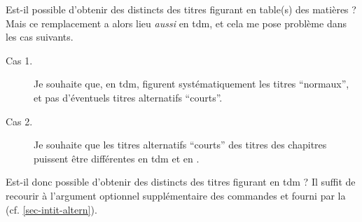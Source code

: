 \begin{dbfaq}{Est-il possible d'obtenir des  distincts
    des titres figurant en table(s) des matières ?}{}
  Mais ce remplacement a alors lieu \emph{aussi} en \gls{tdm}, et cela me pose
  problème dans les cas suivants.
  \begin{description}
  \item[Cas 1.] Je souhaite que, en \gls{tdm}, figurent systématiquement les
    titres \enquote{normaux}, et pas d'éventuels titres alternatifs
    \enquote{courts}.
  \item[Cas 2.] Je souhaite que les titres alternatifs \enquote{courts} des
    titres des chapitres puissent être différentes en \gls{tdm} et en
    .
  \end{description}
  Est-il donc possible d'obtenir des  distincts des
  titres figurant en \gls{tdm} ?%
  \tcblower
  Il suffit de recourir à l'argument optionnel supplémentaire des commandes
   et  fourni par la \yatCl{}
  (cf. \vref{sec-intit-altern}).
\end{dbfaq}

